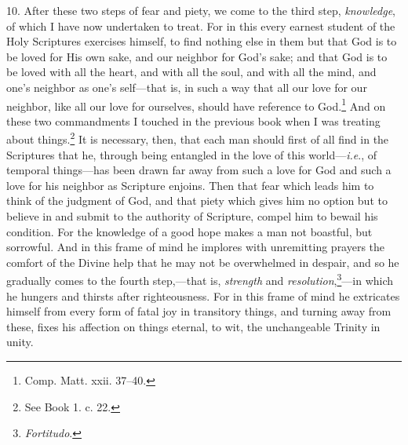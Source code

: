 10. After these two steps of fear and piety, we come to the third step, \emph{knowledge}, of which I have now undertaken to treat. For in this every earnest student of the Holy Scriptures exercises himself, to find nothing else in them but that God is to be loved for His own sake, and our neighbor for God’s sake; and that God is to be loved with all the heart, and with all the soul, and with all the mind, and one’s neighbor as one’s self—that is, in such a way that all our love for our neighbor, like  all our love for ourselves, should have reference to God.\footnote{Comp. Matt. xxii. 37–40.} And on these two commandments I touched in the previous book when I was treating about things.\footnote{See Book 1. c. 22.} It is necessary, then, that each man should first of all find in the Scriptures that he, through being entangled in the love of this world—\emph{i.e}., of temporal things—has been drawn far away from such a love for God and such a love for his neighbor as Scripture enjoins. Then that fear which leads him to think of the judgment of God, and that piety which gives him no option but to believe in and submit to the authority of Scripture, compel him to bewail his condition. For the knowledge of a good hope makes a man not boastful, but sorrowful. And in this frame of mind he implores with unremitting prayers the comfort of the Divine help that he may not be overwhelmed in despair, and so he gradually comes to the fourth step,—that is, \emph{strength} and \emph{resolution},\footnote{\emph{Fortitudo}.}—in which he hungers and thirsts after righteousness. For in this frame of mind he extricates himself from every form of fatal joy in transitory things, and turning away from these, fixes his affection on things eternal, to wit, the unchangeable Trinity in unity.

